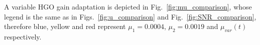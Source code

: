 \documentclass[letterpaper, 10 pt, conference]{ieeeconf}  %
\theoremstyle{plain}
\theoremstyle{definition}
\theoremstyle{remark}
\begin{document}
\begin{table}[]
	\centering
	\caption{RMSE for HGO states and the desired trajectory in each joint of a prosthetic leg according to the observer gain $\mu$}
\end{table}

A variable HGO gain adaptation is depicted in Fig.~\ref{fig:mu_comparison}, whose legend is the same as in Figs.~\ref{fig:u_comparison} and Fig.~\ref{fig:SNR_comparison}, therefore blue, yellow and red represent $\mu_{1} = 0.0004$, $\mu_{2} = 0.0019$ and $\mu_{var}(t)$ respectively.
\end{document}
